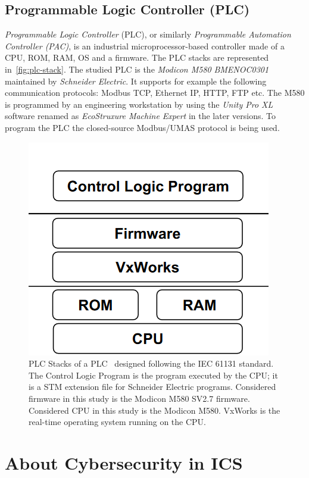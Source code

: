 \subsection{Programmable Logic Controller (PLC)}

\emph{Programmable Logic Controller} (PLC), or similarly \emph{Programmable Automation Controller (PAC)}, is an industrial microprocessor-based controller made of a CPU, ROM, RAM, OS and a firmware. The PLC stacks are represented in~\autoref{fig:plc-stack}. The studied PLC is the \emph{Modicon M580} \emph{BMENOC0301} maintained by \emph{Schneider Electric}. It supports for example the following communication protocols: Modbus TCP, Ethernet IP, HTTP, FTP etc. The M580 is programmed by an engineering workstation by using the \emph{Unity Pro XL} software renamed as \emph{EcoStruxure Machine Expert} in the later versions. To program the PLC the closed-source Modbus/UMAS protocol is being used. 

\begin{figure}
    \centering
    \includegraphics{figures/PLC-stacks}
    \caption{PLC Stacks of a PLC~\cite{Gao21} designed following the IEC 61131 standard. The Control Logic Program is the program executed by the CPU; it is a STM extension file for Schneider Electric programs. Considered firmware in this study is the Modicon M580 SV2.7 firmware. Considered CPU in this study is the Modicon M580. VxWorks is the real-time operating system running on the CPU.}
    \label{fig:plc-stack}
\end{figure}

\section{About Cybersecurity in ICS}

